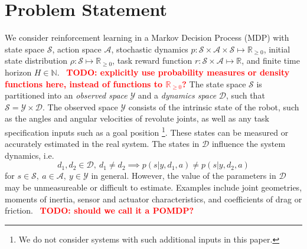 \documentclass{article}
\newcommand{\R}{\mathbb{R}}
\newcommand{\TODO}[1]{\textcolor{red}{\textbf{TODO: #1}}}
\newcommand{\cA}{\mathcal{A}}
\newcommand{\cS}{\mathcal{S}}
\newcommand{\sysid}{dynamics}
\newcommand{\obset}{\mathcal{Y}}
\newcommand{\idset}{\mathcal{D}}
\newcommand{\obvar}{y}
\newcommand{\idvar}{d}
\begin{document}
\section{Problem Statement}

We consider reinforcement learning in a Markov Decision Process (MDP)
with state space $\cS$,
action space $\cA$,
stochastic dynamics $p : \cS \times \cA \times \cS \mapsto \R_{\geq 0}$,
initial state distribution $\rho : \cS \mapsto \R_{\geq 0}$,
task reward function $r : \cS \times \cA \mapsto \R$,
and finite time horizon $H \in \mathbb{N}$.
~\TODO{explicitly use probability measures or density functions here, instead of functions to $\R_{\geq 0}$?}
%
The state space $\cS$ is partitioned into
an \emph{observed space} $\obset$
and a \emph{\sysid{} space} $\idset$,
such that $\cS = \obset \times \idset$.
The observed space $\obset$ consists of the intrinsic state of the robot, such as the angles and angular velocities of revolute joints,
as well as any task specification inputs such as a goal position
\footnote{We do not consider systems with such additional inputs in this paper.}.
These states can be measured or accurately estimated in the real system.
The states in $\idset$ influence the system dynamics, i.e.
\begin{equation}
\idvar_1, \idvar_2 \in \idset,\ \idvar_1 \neq \idvar_2 \implies p(s|\obvar,\idvar_1,a) \neq p(s|\obvar,\idvar_2,a)
\end{equation}
for $s \in \cS,\ a \in \cA,\ \obvar \in \obset$ in general.
However, the value of the parameters in $\idset$ may be unmeasureable or difficult to estimate.
Examples include joint geometries, moments of inertia, sensor and actuator characteristics, and coefficients of drag or friction.
~\TODO{should we call it a POMDP?}
\end{document}
